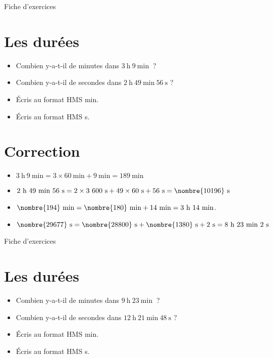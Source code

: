 \documentclass[a4paper,11pt,fleqn]{article}
\begin{document}
\newpage
\setcounter{exo}{0}
\setcounter{section}{0}
\begin{center}
	{\huge Fiche d'exercices } 	
\end{center}


\section{Les durées}
\begin{itemize}
  \item Combien y-a-t-il de minutes dans $3~\text{h}~9~\text{min}~$ ?
  \item Combien y-a-t-il de secondes dans $2~\text{h}~49~\text{min}~56~\text{s}$ ?
  \item Écris au format HMS  min.
  \item Écris au format HMS  s.
\end{itemize}

\section{Correction}
\begin{itemize}
 \item $3~\text{h}~9~\text{min}=3\times60~\text{min}+9~\text{min}=189~\text{min}$
  \item $2~\text{h}~49~\text{min}~56~\text{s}=2\times3~600~\text{s}+49\times60~\text{s}+56~\text{s}=\nombre{10196}~\text{s}$
  \item $\nombre{194}~\text{min}=\nombre{180}~\text{min}+14~\text{min}=3~\text{h}~14~\text{min}$.
  \item $\nombre{29677}~\text{s}=\nombre{28800}~\text{s}+\nombre{1380}~\text{s}+2~\text{s}=8~\text{h}~23~\text{min}~2~\text{s}$ \end{itemize}


\newpage
\setcounter{exo}{0}
\setcounter{section}{0}
\begin{center}
	{\huge Fiche d'exercices } 	
\end{center}


\section{Les durées}
\begin{itemize}
  \item Combien y-a-t-il de minutes dans $9~\text{h}~23~\text{min}~$ ?
  \item Combien y-a-t-il de secondes dans $12~\text{h}~21~\text{min}~48~\text{s}$ ?
  \item Écris au format HMS  min.
  \item Écris au format HMS  s.
\end{itemize}
\end{document}
